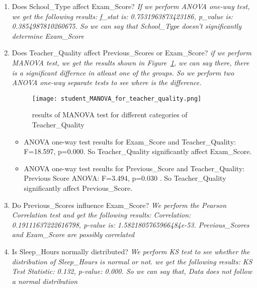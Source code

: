 \documentclass{article}
\begin{document}
\begin{enumerate}
\begin{enumerate}[label= \alph*]
        \item Does School\_Type affect Exam\_Score? 
        \textit{If we perform ANOVA one-way test, we get the following results: f\_stat is: 0.7531963873423186, p\_value is: 0.3854987810260675. So we can say that School\_Type doesn't significantly determine Exam\_Score }
       
        \item Does Teacher\_Quality affect Previous\_Scores or Exam\_Score?
        \textit{if we perform MANOVA test, we get the results shown in Figure~\ref{fig:Figure_10}, we can say there, there is a significant differnce in atleast one of the groups. So we perform two ANOVA one-way separate tests to see where is the difference.}
        \begin{figure}[H]  %

            \centering
            \texttt{[image: student\_MANOVA\_for\_teacher\_quality.png]}  %
            \caption{results of MANOVA test for different categories of Teacher\_Quality}
            \label{fig:Figure_10}  %

        \end{figure}
        \begin{itemize}
            \item ANOVA one-way test results for Exam\_Score and Teacher\_Quality: F=18.597, p=0.000. So Teacher\_Quality significantly affect Exam\_Score.
            \item ANOVA one-way test results for Previous\_Score and Teacher\_Quality: Previous Score ANOVA: F=3.494, p=0.030 . So Teacher\_Quality significantly affect Previous\_Score.
        \end{itemize}

        \item Do Previous\_Scores influence Exam\_Score? 
        \textit{We perform the Pearson Correlation test and get the following results: Correlation: 0.19111637222616798, p-value is: 1.5821805765966484e-53. Previous\_Scores and Exam\_Score are possibly correlated}

        \item Is Sleep\_Hours normally distributed? 
        \textit{We perform KS test to see whether the distribution of Sleep\_Hours is normal or not. we get the following results: KS Test Statistic: 0.132, p-value: 0.000. So we can say that, Data does not follow a normal distribution}
    
    \end{enumerate}

\end{enumerate}
\end{document}
